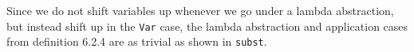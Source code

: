 Since we do not shift variables up whenever we go under a lambda abstraction, but instead shift up in the \texttt{Var} case, the lambda abstraction and application cases from definition 6.2.4 are as trivial as shown in \texttt{subst}.






